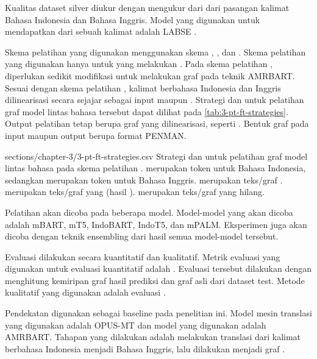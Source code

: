 Kualitas dataset silver diukur dengan mengukur \cossim{} dari \multil{}  dari pasangan kalimat Bahasa Indonesia dan Bahasa Inggris.
Model \mwordem{} yang digunakan untuk mendapatkan \multil{}  dari sebuah kalimat adalah \gls{LABSE} .

Skema pelatihan yang digunakan menggunakan skema , , dan .
Skema pelatihan yang digunakan hanya untuk yang melakukan \amrparsing{}.
Pada skema pelatihan , diperlukan sedikit modifikasi untuk melakukan \pretraining{} graf pada teknik \gls{AMRBART}.
Sesuai dengan skema pelatihan , kalimat berbahasa Indonesia dan Inggris dilinearisasi secara sejajar sebagai input \pretraining{} maupun \finetuning{}.
Strategi \pretraining{} dan \finetuning{} untuk pelatihan graf model \amrparsing{} lintas bahasa tersebut dapat dilihat pada \cref{tab:3-pt-ft-strategies}.
Output pelatihan tetap berupa graf \AMR{} yang dilinearisasi, seperti .
Bentuk graf pada input maupun output berupa format PENMAN.

  {sections/chapter-3/3-pt-ft-strategies.csv}
  {
    Strategi \pretraining{} dan \finetuning{} untuk pelatihan graf model \amrparsing{} lintas bahasa pada skema pelatihan .
     merupakan token untuk Bahasa Indonesia, sedangkan  merupakan token untuk Bahasa Inggris.
     merupakan teks/graf .
     merupakan teks/graf yang  (hasil \denoising{}).
     merupakan teks/graf yang hilang.
  }

Pelatihan \amrparsing{} akan dicoba pada beberapa \multil{} model.
Model-model yang akan dicoba adalah mBART, mT5, IndoBART, IndoT5, dan mPALM.
Eksperimen \amrparsing{} juga akan dicoba dengan teknik \AMR{} ensembling  dari hasil semua model-model tersebut.

Evaluasi dilakukan secara kuantitatif dan kualitatif.
Metrik evaluasi yang digunakan untuk evaluasi kuantitatif adalah \SMATCH{}.
Evaluasi tersebut dilakukan dengan menghitung kemiripan graf \AMR{} hasil prediksi dan graf \AMR{} asli dari dataset test.
Metode kualitatif yang digunakan adalah evaluasi \transdiver{}.

Pendekatan   digunakan sebagai baseline pada penelitian ini.
Model mesin translasi yang digunakan adalah {OPUS-MT} dan model \amrparsing{} yang digunakan adalah \gls{AMRBART}.
Tahapan yang dilakukan adalah melakukan translasi dari kalimat berbahasa Indonesia menjadi Bahasa Inggris, lalu dilakukan \amrparsing{} menjadi graf \AMR{}.
